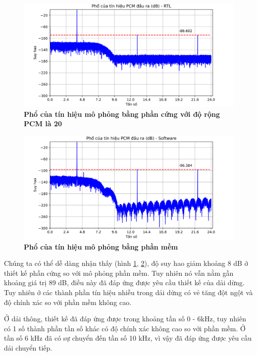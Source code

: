 \begin{figure}[H]
    \centering
    \includegraphics[width=14cm]{Images/Chuong4/tb/sim/psd_sin_1.png}
    \caption[Phổ của tín hiệu mô phỏng bằng phần cứng với độ rộng PCM là 20]{\bfseries \fontsize{12pt}{0pt}\selectfont  Phổ của tín hiệu mô phỏng bằng phần cứng với độ rộng PCM là 20}
    \label{psd_sin_1}
\end{figure}

\begin{figure}[H]
    \centering
    \includegraphics[width=14cm]{Images/Chuong4/tb/sim/psd_sin_1_1.png}
    \caption[ Phổ của tín hiệu mô phỏng bằng phần mềm]{\bfseries \fontsize{12pt}{0pt}\selectfont  Phổ của tín hiệu mô phỏng bằng phần mềm }
    \label{psd_sin_1_1}
\end{figure}

Chúng ta có thể dễ dàng nhận thấy (hình \ref{psd_sin_1}, \ref{psd_sin_1_1}), độ suy hao giảm khoảng 8 dB ở thiết kế phần cứng so với mô phỏng phần mềm. Tuy nhiên nó vẫn nằm gần khoảng giá trị 89 dB, điều này đã đáp ứng được yêu cầu thiết kế của dải dừng. Tuy nhiên ở các thành phần tín hiệu nhiễu trong dải dừng có vẻ tăng đột ngột và độ chính xác so với phần mềm không cao.

Ở dải thông, thiết kế đã đáp ứng được trong khoảng tần số 0 - 6kHz, tuy nhiên có 1 số thành phần tần số khác có độ chính xác không cao so với phần mềm. Ở tần số 6 kHz đã có sự chuyển đến tần số 10 kHz, vì vậy đã đáp ứng được yêu cầu dải chuyển tiếp.


